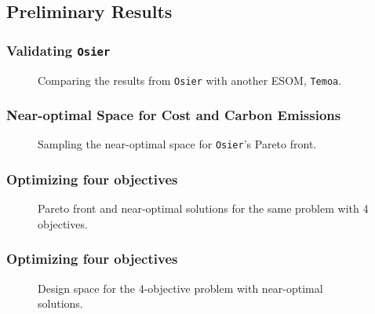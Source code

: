 \subsection{Preliminary Results}

\begin{frame}
    \frametitle{Validating \texttt{Osier}}

    \begin{figure}
        \centering 
        \resizebox{0.75\columnwidth}{!}{}
        \caption{Comparing the results from \texttt{Osier} with another ESOM, \texttt{Temoa}.}
        \label{fig:osier-temoa-benchmark-2}
    \end{figure}

\end{frame}

\begin{frame}
    \frametitle{Near-optimal Space for Cost and Carbon Emissions}

    \begin{figure}
        \centering 
        \resizebox{0.75\columnwidth}{!}{}
        \caption{Sampling the near-optimal space for \texttt{Osier}'s Pareto front.}
        \label{fig:osier-temoa-benchmark-1}
    \end{figure}

\end{frame}




\begin{frame}
    \frametitle{Optimizing four objectives}

    \begin{figure}
        \centering 
        \resizebox{0.9\columnwidth}{!}{}
        \caption{Pareto front and near-optimal solutions for the same problem with 4 objectives.}
        \label{fig:4-obj-objective-space}
    \end{figure}

\end{frame}

\begin{frame}
    \frametitle{Optimizing four objectives}

    \begin{figure}
        \centering 
        \resizebox{0.9\columnwidth}{!}{}
        \caption{Design space for the 4-objective problem with near-optimal solutions.}
        \label{fig:4-obj-design-space}
    \end{figure}

\end{frame}

